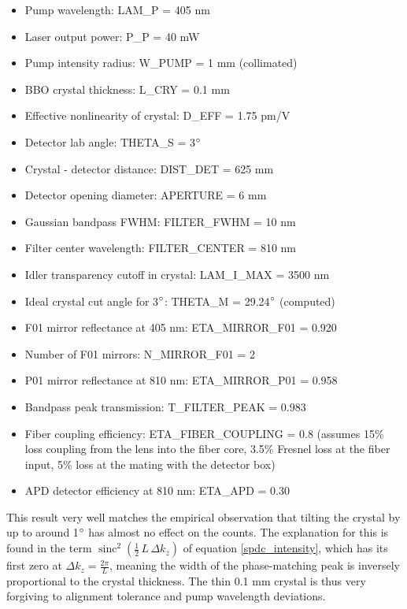 \documentclass[a4paper,
DIV=13,
12pt,
BCOR=10mm,
department=FakEI,
twoside,
parskip=half,
automark,
logostyle=flat,
]{OTHRartcl}
\begin{document}
\begin{itemize}
    \item Pump wavelength: LAM\_P = 405 nm
    \item Laser output power: P\_P = 40 mW
    \item Pump intensity radius: W\_PUMP = 1 mm (collimated)
    \item BBO crystal thickness: L\_CRY = 0.1 mm
    \item Effective nonlinearity of crystal: D\_EFF = 1.75 pm/V \cite{spdc-intensity}
    \item Detector lab angle: THETA\_S = 3$\degree$
    \item Crystal - detector distance: DIST\_DET = 625 mm
    \item Detector opening diameter: APERTURE = 6 mm
    \item Gaussian bandpass FWHM: FILTER\_FWHM = 10 nm
    \item Filter center wavelength: FILTER\_CENTER = 810 nm
    \item Idler transparency cutoff in crystal: LAM\_I\_MAX = 3500 nm \cite{spdc-intensity}
    \item Ideal crystal cut angle for 3$\degree$: THETA\_M = 29.24$\degree$ (computed)
    \item F01 mirror reflectance at 405 nm: ETA\_MIRROR\_F01 = 0.920 \cite{thorlabs_mirrors_data}
    \item Number of F01 mirrors: N\_MIRROR\_F01 = 2
    \item P01 mirror reflectance at 810 nm: ETA\_MIRROR\_P01 = 0.958 \cite{thorlabs_mirrors_data}
    \item Bandpass peak transmission: T\_FILTER\_PEAK = 0.983 \cite{thorlabs_filter_data}
    \item Fiber coupling efficiency: ETA\_FIBER\_COUPLING = 0.8 (assumes 15\% loss coupling from the lens into the fiber core, 3.5\% Fresnel loss at the fiber input, 5\% loss at the mating with the detector box)
    \item APD detector efficiency at 810 nm: ETA\_APD = 0.30 \cite{qutools_apd_data}
\end{itemize}



This result very well matches the empirical observation that tilting the crystal by up to around 1$\degree$ has almost no effect on the counts. The explanation for this is found in the term $\operatorname{sinc}^2 \left(\frac{1}{2}\, L\, \Delta k_z \right)$ of equation \eqref{spdc_intensity}, which has its first zero at $\Delta k_z = \frac{2\pi}{L}$, meaning the width of the phase-matching peak is inversely proportional to the crystal thickness. The thin 0.1 mm crystal is thus very forgiving to alignment tolerance and pump wavelength deviations.
\end{document}
